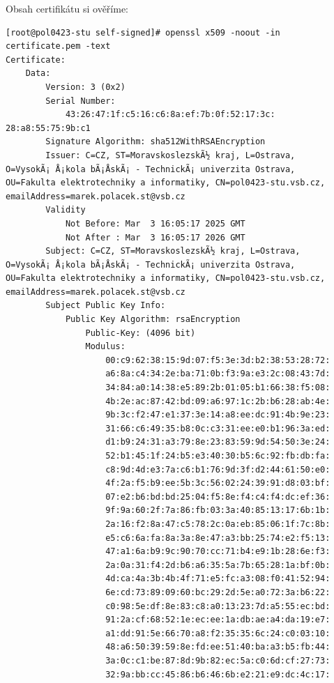 Obsah certifikátu si ověříme:
\begin{verbatim}
[root@pol0423-stu self-signed]# openssl x509 -noout -in
certificate.pem -text
Certificate:
    Data:
        Version: 3 (0x2)
        Serial Number:
            43:26:47:1f:c5:16:c6:8a:ef:7b:0f:52:17:3c:
28:a8:55:75:9b:c1
        Signature Algorithm: sha512WithRSAEncryption
        Issuer: C=CZ, ST=MoravskoslezskÃ½ kraj, L=Ostrava,
O=VysokÃ¡ Å¡kola bÃ¡ÅskÃ¡ - TechnickÃ¡ univerzita Ostrava,
OU=Fakulta elektrotechniky a informatiky, CN=pol0423-stu.vsb.cz,
emailAddress=marek.polacek.st@vsb.cz
        Validity
            Not Before: Mar  3 16:05:17 2025 GMT
            Not After : Mar  3 16:05:17 2026 GMT
        Subject: C=CZ, ST=MoravskoslezskÃ½ kraj, L=Ostrava,
O=VysokÃ¡ Å¡kola bÃ¡ÅskÃ¡ - TechnickÃ¡ univerzita Ostrava,
OU=Fakulta elektrotechniky a informatiky, CN=pol0423-stu.vsb.cz,
emailAddress=marek.polacek.st@vsb.cz
        Subject Public Key Info:
            Public Key Algorithm: rsaEncryption
                Public-Key: (4096 bit)
                Modulus:
                    00:c9:62:38:15:9d:07:f5:3e:3d:b2:38:53:28:72:
                    a6:8a:c4:34:2e:ba:71:0b:f3:9a:e3:2c:08:43:7d:
                    34:84:a0:14:38:e5:89:2b:01:05:b1:66:38:f5:08:
                    4b:2e:ac:87:42:bd:09:a6:97:1c:2b:b6:28:ab:4e:
                    9b:3c:f2:47:e1:37:3e:14:a8:ee:dc:91:4b:9e:23:
                    31:66:c6:49:35:b8:0c:c3:31:ee:e0:b1:96:3a:ed:
                    d1:b9:24:31:a3:79:8e:23:83:59:9d:54:50:3e:24:
                    52:b1:45:1f:24:b5:e3:40:30:b5:6c:92:fb:db:fa:
                    c8:9d:4d:e3:7a:c6:b1:76:9d:3f:d2:44:61:50:e0:
                    4f:2a:f5:b9:ee:5b:3c:56:02:24:39:91:d8:03:bf:
                    07:e2:b6:bd:bd:25:04:f5:8e:f4:c4:f4:dc:ef:36:
                    9f:9a:60:2f:7a:86:fb:03:3a:40:85:13:17:6b:1b:
                    2a:16:f2:8a:47:c5:78:2c:0a:eb:85:06:1f:7c:8b:
                    e5:c6:6a:fa:8a:3a:8e:47:a3:bb:25:74:e2:f5:13:
                    47:a1:6a:b9:9c:90:70:cc:71:b4:e9:1b:28:6e:f3:
                    2a:0a:31:f4:2d:b6:a6:35:5a:7b:65:28:1a:bf:0b:
                    4d:ca:4a:3b:4b:4f:71:e5:fc:a3:08:f0:41:52:94:
                    6e:cd:73:89:09:60:bc:29:2d:5e:a0:72:3a:b6:22:
                    c0:98:5e:df:8e:83:c8:a0:13:23:7d:a5:55:ec:bd:
                    91:2a:cf:68:52:1e:ec:ee:1a:db:ae:a4:da:19:e7:
                    a1:dd:91:5e:66:70:a8:f2:35:35:6c:24:c0:03:10:
                    48:a6:50:39:59:8e:fd:ee:51:40:ba:a3:b5:fb:44:
                    3a:0c:c1:be:87:8d:9b:82:ec:5a:c0:6d:cf:27:73:
                    32:9a:bb:cc:45:86:b6:46:6b:e2:21:e9:dc:4c:17:

\end{verbatim}
